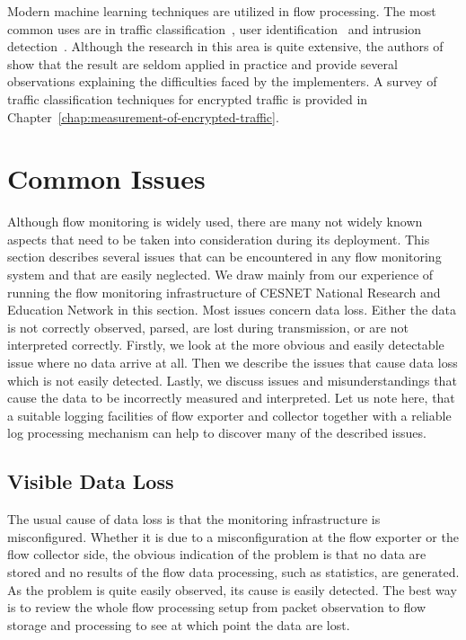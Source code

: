 Modern machine learning techniques are utilized in flow processing. The most common uses are in traffic classification~\cite{Velan-2015-Survey}, user identification~\cite{Verde-2014-No} and intrusion detection~\cite{Tsai-2009-Intrusion}. Although the research in this area is quite extensive, the authors of~\cite{Sommer-2010-Outside} show that the result are seldom applied in practice and provide several observations explaining the difficulties faced by the implementers. A survey of traffic classification techniques for encrypted traffic is provided in Chapter~\ref{chap:measurement-of-encrypted-traffic}.


\section{Common Issues}\label{sec:common-issues}

Although flow monitoring is widely used, there are many not widely known aspects that need to be taken into consideration during its deployment. This section describes several issues that can be encountered in any flow monitoring system and that are easily neglected. We draw mainly from our experience of running the flow monitoring infrastructure of CESNET National Research and Education Network in this section. Most issues concern data loss. Either the data is not correctly observed, parsed, are lost during transmission, or are not interpreted correctly. Firstly, we look at the more obvious and easily detectable issue where no data arrive at all. Then we describe the issues that cause data loss which is not easily detected. Lastly, we discuss issues and misunderstandings that cause the data to be incorrectly measured and interpreted. Let us note here, that a suitable logging facilities of flow exporter and collector together with a reliable log processing mechanism can help to discover many of the described issues.

\subsection{Visible Data Loss}

The usual cause of data loss is that the monitoring infrastructure is misconfigured. Whether it is due to a misconfiguration at the flow exporter or the flow collector side, the obvious indication of the problem is that no data are stored and no results of the flow data processing, such as statistics, are generated. As the problem is quite easily observed, its cause is easily detected. The best way is to review the whole flow processing setup from packet observation to flow storage and processing to see at which point the data are lost.

